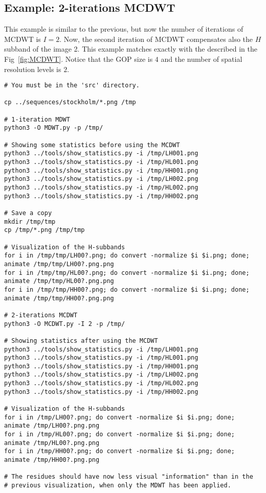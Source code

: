 \subsection*{Example: 2-iterations MCDWT}
This example is similar to the previous, but now the number of
iterations of MCDWT is $I=2$. Now, the second iteration of MCDWT
compensates also the $H$ subband of the image 2. This example matches
exactly with the described in the Fig~\ref{fig:MCDWT}. Notice that the
GOP size is $4$ and the number of spatial resolution levels is $2$.

\begin{verbatim}
# You must be in the 'src' directory.

cp ../sequences/stockholm/*.png /tmp

# 1-iteration MDWT
python3 -O MDWT.py -p /tmp/

# Showing some statistics before using the MCDWT
python3 ../tools/show_statistics.py -i /tmp/LH001.png
python3 ../tools/show_statistics.py -i /tmp/HL001.png
python3 ../tools/show_statistics.py -i /tmp/HH001.png
python3 ../tools/show_statistics.py -i /tmp/LH002.png
python3 ../tools/show_statistics.py -i /tmp/HL002.png
python3 ../tools/show_statistics.py -i /tmp/HH002.png

# Save a copy
mkdir /tmp/tmp
cp /tmp/*.png /tmp/tmp

# Visualization of the H-subbands
for i in /tmp/tmp/LH00?.png; do convert -normalize $i $i.png; done; animate /tmp/tmp/LH00?.png.png
for i in /tmp/tmp/HL00?.png; do convert -normalize $i $i.png; done; animate /tmp/tmp/HL00?.png.png
for i in /tmp/tmp/HH00?.png; do convert -normalize $i $i.png; done; animate /tmp/tmp/HH00?.png.png 

# 2-iterations MCDWT
python3 -O MCDWT.py -I 2 -p /tmp/

# Showing statistics after using the MCDWT
python3 ../tools/show_statistics.py -i /tmp/LH001.png
python3 ../tools/show_statistics.py -i /tmp/HL001.png
python3 ../tools/show_statistics.py -i /tmp/HH001.png
python3 ../tools/show_statistics.py -i /tmp/LH002.png
python3 ../tools/show_statistics.py -i /tmp/HL002.png
python3 ../tools/show_statistics.py -i /tmp/HH002.png

# Visualization of the H-subbands
for i in /tmp/LH00?.png; do convert -normalize $i $i.png; done; animate /tmp/LH00?.png.png
for i in /tmp/HL00?.png; do convert -normalize $i $i.png; done; animate /tmp/HL00?.png.png
for i in /tmp/HH00?.png; do convert -normalize $i $i.png; done; animate /tmp/HH00?.png.png

# The residues should have now less visual "information" than in the
# previous visualization, when only the MDWT has been applied.
\end{verbatim}

